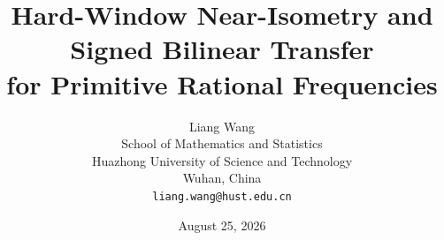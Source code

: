 \documentclass[11pt]{article}
\title{Hard-Window Near-Isometry and Signed Bilinear Transfer\\
for Primitive Rational Frequencies}
\author{Liang Wang\\
School of Mathematics and Statistics\\
Huazhong University of Science and Technology\\
Wuhan, China\\
\texttt{liang.wang@hust.edu.cn}}
\date{August 25, 2026}
\theoremstyle{remark}
\begin{document}
\maketitle

\begin{abstract}

\end{abstract}














\appendix

\end{document}

